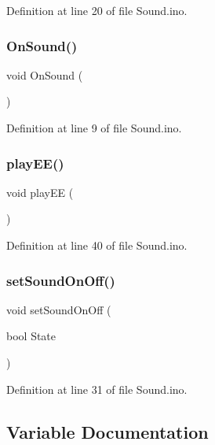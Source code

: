 Definition at line 20 of file Sound.\+ino.

\mbox{\label{_sound_8ino_a0466989c93ff7d4321060a5423eb997e}} 
\subsubsection{\texorpdfstring{OnSound()}{OnSound()}}
{\footnotesize\ttfamily void On\+Sound (\begin{DoxyParamCaption}{ }\end{DoxyParamCaption})}



Definition at line 9 of file Sound.\+ino.

\mbox{\label{_sound_8ino_a74e1eb2b9326ce9bbb5fca9634e019cd}} 
\subsubsection{\texorpdfstring{playEE()}{playEE()}}
{\footnotesize\ttfamily void play\+EE (\begin{DoxyParamCaption}{ }\end{DoxyParamCaption})}



Definition at line 40 of file Sound.\+ino.

\mbox{\label{_sound_8ino_a2da81ea6c59e514b01a933ed8475281c}} 
\subsubsection{\texorpdfstring{setSoundOnOff()}{setSoundOnOff()}}
{\footnotesize\ttfamily void set\+Sound\+On\+Off (\begin{DoxyParamCaption}\item[{bool}]{State }\end{DoxyParamCaption})}



Definition at line 31 of file Sound.\+ino.



\subsection{Variable Documentation}
\mbox{\label{_sound_8ino_a56c8a5eda9a66e3eae61c7c18e163d43}} 
